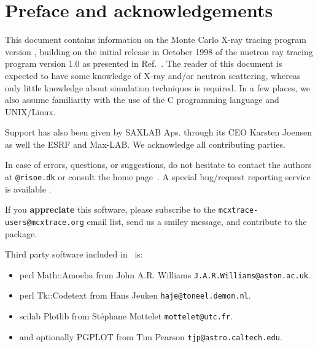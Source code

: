 
\chapter*{Preface and acknowledgements}
This document contains information on the Monte Carlo
X-ray tracing program \MCX version \version, building on the initial
release in October 1998 of the nuetron ray tracing program \MCX version 1.0 as presented in Ref.~\cite{nn_10_20}. The reader of this
document is expected to have some knowledge of X-ray and/or neutron scattering,
whereas only little knowledge about simulation techniques is
required. In a few places, we also assume familiarity with the
use of the C programming language and UNIX/Linux.

Support has also been given by SAXLAB Aps. through its CEO Karsten Joensen as well 
the ESRF and Max-LAB. We acknowledge all contributing parties. 


In case of errors, questions, or suggestions,
do not hesitate to
contact the authors at \verb+@risoe.dk+
or consult the \MCX home page~\cite{mcxtrace_webpage}.
A special bug/request reporting service is available \cite{mczilla_webpage}.

If you {\bfseries appreciate} this software, please subscribe to the \verb+mcxtrace-users@mcxtrace.org+ email list, send us a smiley message, and contribute to the package. 




Third party software included in \MCX\ is:
\begin{itemize}
\item perl Math::Amoeba from John A.R. Williams \verb+J.A.R.Williams@aston.ac.uk+.
\item perl Tk::Codetext from Hans Jeuken \verb+haje@toneel.demon.nl+.
\item scilab Plotlib from St\'ephane Mottelet \verb+mottelet@utc.fr+.
\item and optionally PGPLOT from Tim Pearson \verb+tjp@astro.caltech.edu+.
\end{itemize}

